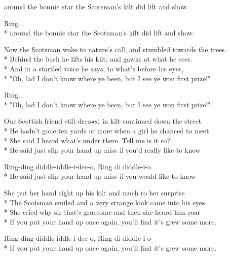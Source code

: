 \begin{SongText}
\begin{SongVerse}
around the bonnie star the Scotsman's kilt did lift and show.
\end{SongVerse}
\begin{SongVerse}
Ring...\\*%
around the bonnie star the Scotsman's kilt did lift and show. 
\end{SongVerse}
\begin{SongVerse}
Now the Scotsman woke to nature's call, and stumbled towards the trees.\\*%
Behind the bush he lifts his kilt, and gawks at what he sees.\\*%
And in a startled voice he says, to what's before his eyes,\\*%
"Oh, lad I don't know where ye been, but I see ye won first prize!"
\end{SongVerse}
\begin{SongVerse}
Ring...\\*%
"Oh, lad I don't know where ye been, but I see ye won first prize!"
\end{SongVerse}
\end{SongText}
\begin{SongText}
\begin{SongVerse}
Our Scottish friend still dressed in kilt continued down the street\\*%
He hadn't gone ten yards or more when a girl he chanced to meet\\*%
She said I heard what's under there. Tell me is it so?\\*%
He said just slip your hand up miss if you'd really like to know
\end{SongVerse}
\begin{SongVerse}
Ring-ding diddle-iddle-i-dee-o, Ring di diddle-i-o\\*%
He said just slip your hand up miss if you would like to know
\end{SongVerse}
\begin{SongVerse}
She put her hand right up his kilt and much to her surprise\\*%
The Scotsman smiled and a very strange look came into his eyes\\*%
She cried why sir that’s gruesome and then she heard him roar\\*%
If you put your hand up once again, you'll find it's grew some more.
\end{SongVerse}
\begin{SongVerse}
Ring-ding diddle-iddle-i-dee-o, Ring di diddle-i-o\\*%
If you put your hand up once again, you'll find it's grew some more.
\end{SongVerse}
\end{SongText}
